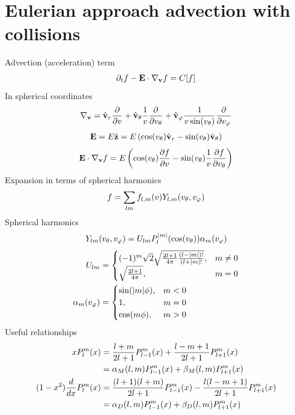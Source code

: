 \documentclass{article}[draft]
\begin{document}
\section{Eulerian approach advection with collisions} 
Advection (acceleration) term
\begin{align*}
\partial_t f - \mathbf{E}\cdot \nabla_{\mathbf{v}} f = C[f]
\end{align*}
In spherical coordinates
\begin{align*}
\nabla_{\vect{v}} 
= \vrunit \frac{\partial}{\partial \vr}
+ \vthetaunit \frac{1}{\vr} \frac{\partial}{\partial \vtheta}
+ \vphiunit \frac{1}{\vr \sin\of{\vtheta}} \frac{\partial}{\partial \vphi}
\end{align*}
\begin{align*}
\vect{E} 
= E \hat{\vect{z}} 
= E \left( \cos\of{\vtheta} \vrunit - \sin\of{\vtheta} \vthetaunit \right)
\end{align*}
\begin{align*}
\vect{E}\cdot \nabla_{\vect{v}} f
= E 
\left( \cos\of{\vtheta} \frac{\partial f}{\partial \vr} 
- \sin\of{\vtheta} \frac{1}{\vr} \frac{\partial f}{\partial \vtheta} \right)
\end{align*}
Expansion in terms of spherical harmonics
\begin{align*}
f = 
\sum_{lm} f_{l,m}\of{\vr} Y_{l,m}\of{\vtheta,\vphi}
\end{align*}
Spherical harmonics
\begin{align*}
Y_{lm}\of{\vtheta,\vphi} = U_{lm} P^{|m|}_l\of{\cos\of{\vtheta}} \alpha_m\of{\vphi}
\end{align*}
\begin{align*}
U_{lm} &= 
\begin{cases}
(-1)^m \sqrt{2} \sqrt{\frac{2l+1}{4\pi} \frac{(l-|m|)!}{(l+|m|!}}, &m\neq 0 \\
\sqrt{\frac{2l+1}{4\pi}}, &m = 0
\end{cases}
\\
\alpha_m\of{\vphi}
&=
\begin{cases}
\sin\of{|m|\phi}, &m < 0 \\
1, &m = 0\\
\cos\of{m\phi}, &m > 0
\end{cases}
\end{align*}
Useful relationships
\begin{align*}
x P^m_l\of{x} 
&= \frac{l+m}{2l+1} P^m_{l-1}\of{x}
+ \frac{l-m+1}{2l+1} P^m_{l+1}\of{x}
\\
&= \alpha_M\of{l,m} P^m_{l-1}\of{x}
+ \beta_M\of{l,m} P^m_{l+1}\of{x}
\\
(1-x^2) \frac{d}{dx} P^m_l\of{x} 
&= \frac{(l+1)(l+m)}{2l+1} P^m_{l-1}\of{x} 
- \frac{l(l-m+1)}{2l+1} P^m_{l+1}\of{x}
\\
&= \alpha_D\of{l,m} P^m_{l-1}\of{x} 
+ \beta_D\of{l,m} P^m_{l+1}\of{x}
\end{align*}
\end{document}

